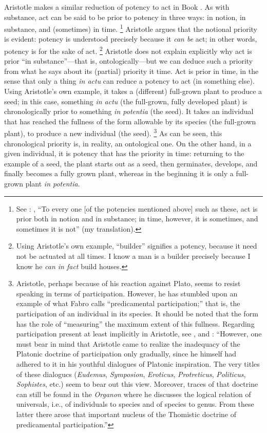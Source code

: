 Aristotle makes a similar reduction of potency to act in Book . As with substance, act can be said to be prior to potency in three ways: in notion, in substance, and (sometimes) in time.%
%
\footnote{See \cite[,~8, 1049b11--12]{aristotle:metaphysics}: , ``To every one [of the potencies mentioned above] such as these, act is prior both in notion and in substance; in time, however, it is sometimes, and sometimes it is not'' (my translation).} Aristotle argues that the notional priority is evident: potency is understood precisely because it \emph{can be} act; in other words, potency is for the sake of act.%
%
\footnote{Using Aristotle's own example, ``builder'' signifies a potency, because it need not be actuated at all times. I know a man is a builder precisely because I know he \emph{can in fact} build houses.}%
%
Aristotle does not explain explicitly why act is prior ``in substance''---that is, ontologically---but we can deduce such a priority from what he says about its (partial) priority it time. Act is prior in time, in the sense that only a thing \emph{in actu} can reduce a potency to act (in something else). Using Aristotle's own example, it takes a (different) full-grown plant to produce a seed; in this case, something \emph{in actu} (the full-grown, fully developed plant) is chronologically prior to something \emph{in potentia} (the seed). It takes an individual that has reached the fullness of the form allowable by its species (the full-grown plant), to produce a new individual (the seed).%
%
\footnote{Aristotle, perhaps because of his reaction against Plato, seems to resist speaking in terms of participation. However, he has stumbled upon an example of what Fabro calls ``predicamental participation;'' that is, the participation of an individual in its species. It should be noted that the form has the role of ``measuring'' the maximum extent of this fullness. Regarding participation present at least implicitly in Aristotle, see \cite[307--316]{fabro:partecipazione}, and \cite[456]{fabro:intensive}: ``However, one must bear in mind that Aristotle came to realize the inadequacy of the Platonic doctrine of participation only gradually, since he himself had adhered to it in his youthful dialogues of Platonic inspiration. The very titles of these dialogucs (\emph{Eudemus}, \emph{Symposion}, \emph{Eroticus}, \emph{Protreticus}, \emph{Politicus}, \emph{Sophistes}, etc.) seem to bear out this view. Moreover, traces of that doctrine can still be found in the \emph{Organon} where he discusses the logical relation of universals, i.e., of individuals to species and of species to genus. From these latter there arose that important nucleus of the Thomistic doctrine of predicamental participation.''}
%
As can be seen, this chronological priority is, in reality, an ontological one. On the other hand, in a given individual, it is potency that has the priority in time: returning to the example of a seed, the plant starts out as a seed, then germinates, develops, and finally becomes a fully grown plant, whereas in the beginning it is only a full-grown plant \emph{in potentia}.

